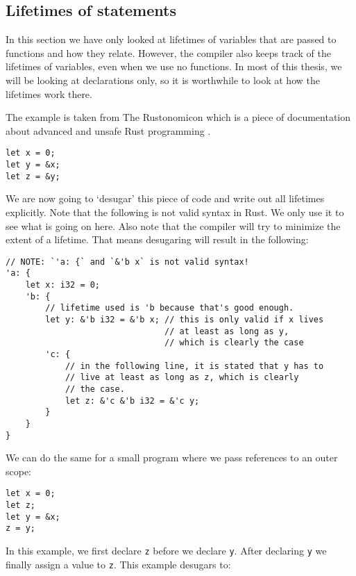\subsection{Lifetimes of statements}\label{desugar}
In this section we have only looked at lifetimes of variables that are passed to functions and how they relate. However, the compiler also keeps track of the lifetimes of variables, even when we use no functions. In most of this thesis, we will be looking at declarations only, so it is worthwhile to look at how the lifetimes work there. 

The example is taken from The Rustonomicon which is a piece of documentation about advanced and unsafe Rust programming \citep{lifetimes2}.

\begin{verbatim}
let x = 0;
let y = &x;
let z = &y;
\end{verbatim}

We are now going to `desugar' this piece of code and write out all lifetimes explicitly. Note that the following is not valid syntax in Rust. We only use it to see what is going on here. Also note that the compiler will try to minimize the extent of a lifetime. That means desugaring will result in the following: 

\begin{verbatim}
// NOTE: `'a: {` and `&'b x` is not valid syntax!
'a: {
    let x: i32 = 0;
    'b: {
        // lifetime used is 'b because that's good enough.
        let y: &'b i32 = &'b x; // this is only valid if x lives 
                                // at least as long as y, 
                                // which is clearly the case
        'c: {
            // in the following line, it is stated that y has to 
            // live at least as long as z, which is clearly 
            // the case. 
            let z: &'c &'b i32 = &'c y;
        }
    }
}
\end{verbatim}

We can do the same for a small program where we pass references to an outer scope:

\begin{verbatim}
let x = 0;
let z;
let y = &x;
z = y;
\end{verbatim}

In this example, we first declare \verb|z| before we declare \verb|y|. After declaring \verb|y| we finally assign a value to \verb|z|. This example desugars to:

